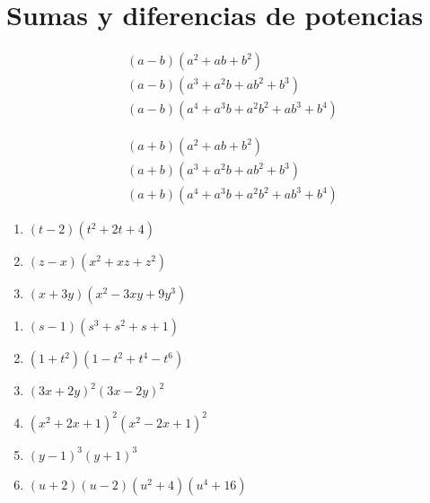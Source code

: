 
\section{Sumas y diferencias de potencias}


	\begin{problema}
		\begin{align}
			\left( a-b \right)\left( a^{2}+ab+b^{2} \right)\\
			\left( a-b \right)\left( a^{3}+a^{2}b+ab^{2}+b^{3} \right)\\
			\left( a-b \right)\left( a^{4}+a^{3}b+a^{2}b^{2}+ab^{3}+b^{4} \right)
		\end{align}
		
	\end{problema}
	



	\begin{problema}
		\begin{align}
			\left( a+b \right)\left( a^{2}+ab+b^{2} \right)\\
			\left( a+b \right)\left( a^{3}+a^{2}b+ab^{2}+b^{3} \right)\\
			\left( a+b \right)\left( a^{4}+a^{3}b+a^{2}b^{2}+ab^{3}+b^{4} \right)
		\end{align}
		
	\end{problema}
	



	\begin{problema}
		\begin{enumerate}
			\item $\left( t-2 \right)\left( t^{2}+2t+4 \right)$ 
			\item $\left( z-x \right)\left( x^{2}+xz+z^{2} \right)$ 
			\item $\left( x+3y \right)\left( x^{2}-3xy+9y^{3} \right)$
		\end{enumerate}
		
	\end{problema}
	



	\begin{problema}
		\begin{enumerate}
			\item $\left( s-1 \right)\left( s^{3}+s^{2}+s +1\right)$ 
			\item $\left( 1+t^{2} \right)\left( 1-t^{2}+t^{4}-t^{6} \right)$ 
			\item $\left( 3x+2y \right)^{2}\left( 3x-2y \right)^{2}$ 
			\item $\left( x^{2}+2x+1 \right)^{2}\left( x^{2}-2x+1 \right)^{2}$ 
			\item $\left( y-1 \right)^{3}\left( y+1 \right)^{3}$
			\item $(u+2)(u-2)(u^{2}+4)(u^{4}+16)$
		\end{enumerate}
		
	\end{problema}
	

